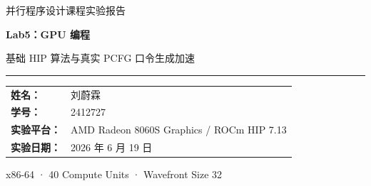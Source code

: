 \documentclass[UTF8,11pt,a4paper]{ctexart}
\newcommand{\meanstd}[2]{#1\,$\pm$\,#2}
\begin{document}
\begin{titlepage}
  \centering
  \vspace*{2.2cm}
  {\Large 并行程序设计课程实验报告\par}
  \vspace{1.4cm}
  {\fontsize{26}{34}\selectfont\bfseries Lab5：GPU 编程\par}
  \vspace{0.45cm}
  {\Large 基础 HIP 算法与真实 PCFG 口令生成加速\par}
  \vspace{1.4cm}
  \rule{0.82\textwidth}{0.7pt}
  \vspace{1.2cm}

  \begin{tabular}{>{\bfseries}p{3cm}p{8cm}}
    姓名： & 刘蔚霖 \\[0.3cm]
    学号： & 2412727 \\[0.3cm]
    实验平台： & AMD Radeon 8060S Graphics / ROCm HIP 7.13 \\[0.8cm]
    实验日期： & 2026 年 6 月 19 日 \\
  \end{tabular}

  \vfill
  {\color{Muted}x86-64 · 40 Compute Units · Wavefront Size 32\par}
\end{titlepage}

\begin{abstract}
本实验使用图形处理器（Graphics Processing Unit，GPU）和异构计算可移植接口（Heterogeneous-compute Interface for Portability，HIP），完成向量加法、矩阵转置、直方图、归约、Monte Carlo 积分与 K-Means 聚类六项基础实验，并构建概率上下文无关文法（Probabilistic Context-Free Grammar，PCFG）口令候选生成的 GPU 数据通路。PCFG 实验包含单概率模板（probabilistic template，PT）、多 PT 批处理、stream overlap、CPU/GPU 调度和真实模型端到端生成。六个 Notebook 均完整执行；四阶段合成实验的 80 条记录全部通过；真实 PCFG 实验以 RockYou 100 万行子集训练模型，解析 1,003,870 个口令，形成 9,888 个 PT，并在 199 个 WorkUnit 上取得 90/90 条正确记录。1M 候选规模下，4-PT batch 的墙钟时间为 \meanstd{42.92}{3.50} ms，同轮 CPU baseline 的中位加速比为 5.46×；默认调度的墙钟时间为 \meanstd{50.64}{7.38} ms，中位加速比为 4.77×。实验同时显示，小规模任务受传输和主机端结构转换支配，真实 overlap 路径还受到结果还原成本限制。本文基于分段计时、同轮配对加速比、哈希校验和路由守恒分析这些边界。

\noindent\textbf{关键词：} GPU；HIP；并行算法；PCFG；批处理；异构调度；性能分析
\end{abstract}
\end{document}
